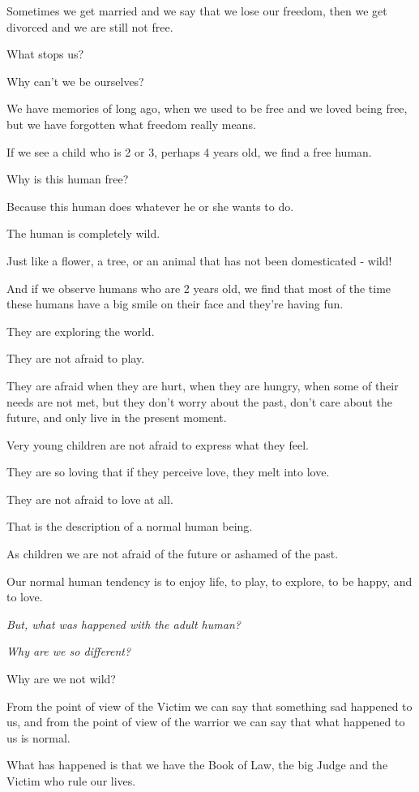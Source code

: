 \documentclass{article}
\numberwithin{equation}{section}
\begin{document}
Sometimes we get married and we say that we lose our freedom, then we get divorced and we are still not free.

What stops us?

Why can't we be ourselves?

%
We have memories of long ago, when we used to be free and we loved being free, but we have forgotten what freedom really means.

%
If we see a child who is 2 or 3, perhaps 4 years old, we find a free human.

Why is this human free?

Because this human does whatever he or she wants to do.

The human is completely wild.

Just like a flower, a tree, or an animal that has not been domesticated - wild!

And if we observe humans who are 2 years old, we find that most of the time these humans have a big smile on their face and they're having fun.

They are exploring the world.

They are not afraid to play.

They are afraid when they are hurt, when they are hungry, when some of their needs are not met, but they don't worry about the past, don't care about the future, and only live in the present moment.

%
Very young children are not afraid to express what they feel.

They are so loving that if they perceive love, they melt into love.

They are not afraid to love at all.

That is the description of a normal human being.

As children we are not afraid of the future or ashamed of the past.

Our normal human tendency is to enjoy life, to play, to explore, to be happy, and to love.

%
\textit{But, what was happened with the adult human?}

\textit{Why are we so different?}

Why are we not wild?

From the point of view of the Victim we can say that something sad happened to us, and from the point of view of the warrior we can say that what happened to us is normal.

What has happened is that we have the Book of Law, the big Judge and the Victim who rule our lives.
\end{document}
